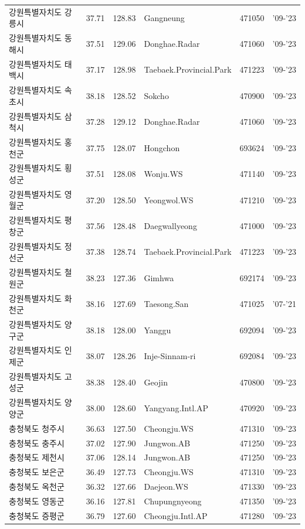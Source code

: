 \begin{longtable}{lcclcc}
  강원특별자치도 강릉시 & 37.71 & 128.83 & Gangneung & 471050 & '09-'23 \\
  강원특별자치도 동해시 & 37.51 & 129.06 & Donghae.Radar & 471060 & '09-'23 \\
  강원특별자치도 태백시 & 37.17 & 128.98 & Taebaek.Provincial.Park & 471223 & '09-'23 \\
  강원특별자치도 속초시 & 38.18 & 128.52 & Sokcho & 470900 & '09-'23 \\
  강원특별자치도 삼척시 & 37.28 & 129.12 & Donghae.Radar & 471060 & '09-'23 \\
  강원특별자치도 홍천군 & 37.75 & 128.07 & Hongchon & 693624 & '09-'23 \\
  강원특별자치도 횡성군 & 37.51 & 128.08 & Wonju.WS & 471140 & '09-'23 \\
  강원특별자치도 영월군 & 37.20 & 128.50 & Yeongwol.WS & 471210 & '09-'23 \\
  강원특별자치도 평창군 & 37.56 & 128.48 & Daegwallyeong & 471000 & '09-'23 \\
  강원특별자치도 정선군 & 37.38 & 128.74 & Taebaek.Provincial.Park & 471223 & '09-'23 \\
  강원특별자치도 철원군 & 38.23 & 127.36 & Gimhwa & 692174 & '09-'23 \\
  강원특별자치도 화천군 & 38.16 & 127.69 & Taesong.San & 471025 & '07-'21 \\
  강원특별자치도 양구군 & 38.18 & 128.00 & Yanggu & 692094 & '09-'23 \\
  강원특별자치도 인제군 & 38.07 & 128.26 & Inje-Sinnam-ri & 692084 & '09-'23 \\
  강원특별자치도 고성군 & 38.38 & 128.40 & Geojin & 470800 & '09-'23 \\
  강원특별자치도 양양군 & 38.00 & 128.60 & Yangyang.Intl.AP & 470920 & '09-'23 \\
  충청북도 청주시 & 36.63 & 127.50 & Cheongju.WS & 471310 & '09-'23 \\
  충청북도 충주시 & 37.02 & 127.90 & Jungwon.AB & 471250 & '09-'23 \\
  충청북도 제천시 & 37.06 & 128.14 & Jungwon.AB & 471250 & '09-'23 \\
  충청북도 보은군 & 36.49 & 127.73 & Cheongju.WS & 471310 & '09-'23 \\
  충청북도 옥천군 & 36.32 & 127.66 & Daejeon.WS & 471330 & '09-'23 \\
  충청북도 영동군 & 36.16 & 127.81 & Chupungnyeong & 471350 & '09-'23 \\
  충청북도 증평군 & 36.79 & 127.60 & Cheongju.Intl.AP & 471280 & '09-'23 \\

\end{longtable}
